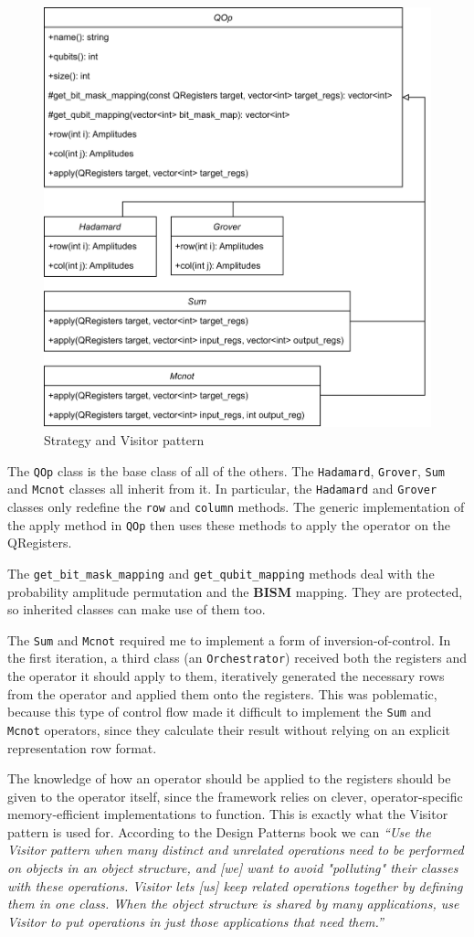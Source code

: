 \begin{figure}[H]
    \centering
    \includegraphics[width=0.7\linewidth]{content/assets/04_simulator_implementation/uml.png}
    \caption{Strategy and Visitor pattern}
    \label{fig:my_label}
\end{figure}

The \texttt{QOp} class is the base class of all of the others. The \texttt{Hadamard}, \texttt{Grover}, \texttt{Sum} and \texttt{Mcnot} classes all inherit from it. In particular, the \texttt{Hadamard} and \texttt{Grover} classes only redefine the \texttt{row} and \texttt{column} methods. The generic implementation of the apply method in \texttt{QOp} then uses these methods to apply the operator on the QRegisters.

The \texttt{get\_bit\_mask\_mapping} and \texttt{get\_qubit\_mapping} methods deal with the probability amplitude permutation and the \textbf{BISM} mapping. They are protected, so inherited classes can make use of them too.

The \texttt{Sum} and \texttt{Mcnot} required me to implement a form of inversion-of-control. In the first iteration, a third class (an \texttt{Orchestrator}) received both the registers and the operator it should apply to them, iteratively generated the necessary rows from the operator and applied them onto the registers. This was poblematic, because this type of control flow made it difficult to implement the \texttt{Sum} and \texttt{Mcnot} operators, since they calculate their result without relying on an explicit representation row format.

The knowledge of how an operator should be applied to the registers should be given to the operator itself, since the framework relies on clever, operator-specific memory-efficient implementations to function. This is exactly what the Visitor pattern is used for. According to the Design Patterns\cite{DesignPatterns} book we can \textit{``Use the Visitor pattern when many distinct and unrelated operations need to be performed on objects in an object structure, and [we] want to avoid "polluting" their classes with these operations. Visitor lets [us] keep related operations together by defining them in one class. When the object structure is shared by many applications, use Visitor to put operations in just those applications that need them.''}
